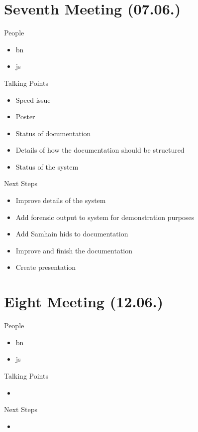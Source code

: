 \section{Seventh Meeting (07.06.)}
\label{sec:meeting07}

People
\begin{itemize}
    \item \gls{bn}
    \item \gls{js}
\end{itemize}

Talking Points
\begin{itemize}
    \item Speed issue
    \item Poster
    \item Status of documentation
    \item Details of how the documentation should be structured
    \item Status of the system
\end{itemize}

Next Steps
\begin{itemize}
    \item Improve details of the system
    \item Add forensic output to system for demonstration purposes
    \item Add Samhain \gls{hids} to documentation
    \item Improve and finish the documentation
    \item Create presentation 
\end{itemize}

\section{Eight Meeting (12.06.)}
\label{sec:meeting08}

People
\begin{itemize}
    \item \gls{bn}
    \item \gls{js}
\end{itemize}

Talking Points
\begin{itemize}
    \item 
\end{itemize}

Next Steps
\begin{itemize}
    \item 
\end{itemize}
